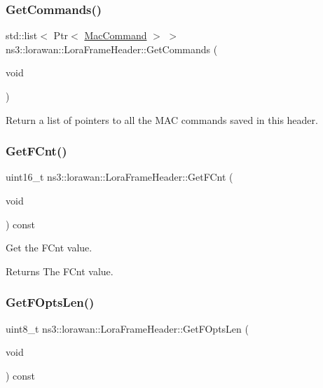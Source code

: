 \subsubsection{\texorpdfstring{Get\+Commands()}{GetCommands()}}
{\footnotesize\ttfamily std\+::list$<$ Ptr$<$ \hyperlink{classns3_1_1lorawan_1_1MacCommand}{Mac\+Command} $>$ $>$ ns3\+::lorawan\+::\+Lora\+Frame\+Header\+::\+Get\+Commands (\begin{DoxyParamCaption}\item[{void}]{ }\end{DoxyParamCaption})}

Return a list of pointers to all the M\+AC commands saved in this header. \mbox{\label{classns3_1_1lorawan_1_1LoraFrameHeader_aca554586ea869137a7ab1f5db6c81a1f}} 
\subsubsection{\texorpdfstring{Get\+F\+Cnt()}{GetFCnt()}}
{\footnotesize\ttfamily uint16\+\_\+t ns3\+::lorawan\+::\+Lora\+Frame\+Header\+::\+Get\+F\+Cnt (\begin{DoxyParamCaption}\item[{void}]{ }\end{DoxyParamCaption}) const}

Get the F\+Cnt value.

\begin{DoxyReturn}{Returns}
The F\+Cnt value. 
\end{DoxyReturn}
\mbox{\label{classns3_1_1lorawan_1_1LoraFrameHeader_af9e5cbf58842f7527fbbceba2e6818fe}} 
\subsubsection{\texorpdfstring{Get\+F\+Opts\+Len()}{GetFOptsLen()}}
{\footnotesize\ttfamily uint8\+\_\+t ns3\+::lorawan\+::\+Lora\+Frame\+Header\+::\+Get\+F\+Opts\+Len (\begin{DoxyParamCaption}\item[{void}]{ }\end{DoxyParamCaption}) const}


